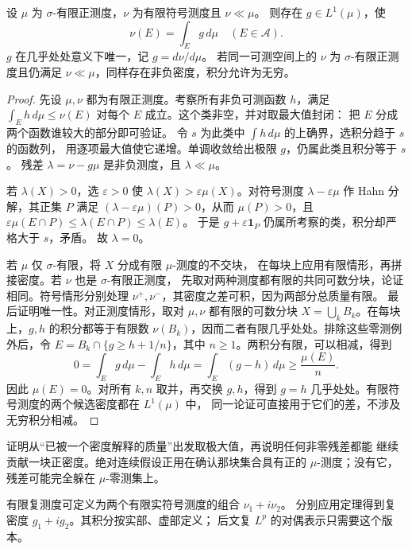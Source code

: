 \begin{theorem}\label{thm:radon-nikodym}
设 \(\mu\) 为 \(\sigma\)-有限正测度，\(\nu\) 为有限符号测度且 \(\nu\ll\mu\)。
则存在 \(g\in L^1(\mu)\)，使
\[
 \nu(E)=\int_Eg\,d\mu\quad(E\in\mathcal A).
\]
\(g\) 在几乎处处意义下唯一，记 \(g=d\nu/d\mu\)。
若同一可测空间上的 \(\nu\) 为 \(\sigma\)-有限正测度且仍满足
\(\nu\ll\mu\)，同样存在非负密度，积分允许为无穷。
\end{theorem}
\begin{proof}
先设 \(\mu,\nu\) 都为有限正测度。考察所有非负可测函数 \(h\)，满足
\(\int_Eh\,d\mu\le\nu(E)\) 对每个 \(E\) 成立。这个类非空，并对取最大值封闭：
把 \(E\) 分成两个函数谁较大的部分即可验证。
令 \(s\) 为此类中 \(\int h\,d\mu\) 的上确界，选积分趋于 \(s\) 的函数列，
用逐项最大值使它递增。单调收敛给出极限 \(g\)，仍属此类且积分等于 \(s\)。
残差 \(\lambda=\nu-g\mu\) 是非负测度，且 \(\lambda\ll\mu\)。

若 \(\lambda(X)>0\)，选 \(\varepsilon>0\) 使
\(\lambda(X)>\varepsilon\mu(X)\)。对符号测度 \(\lambda-\varepsilon\mu\)
作 Hahn 分解，其正集 \(P\) 满足
\((\lambda-\varepsilon\mu)(P)>0\)，从而 \(\mu(P)>0\)，且
\(\varepsilon\mu(E\cap P)\le\lambda(E\cap P)\le\lambda(E)\)。
于是 \(g+\varepsilon\mathbf1_P\) 仍属所考察的类，积分却严格大于 \(s\)，矛盾。
故 \(\lambda=0\)。

若 \(\mu\) 仅 \(\sigma\)-有限，将 \(X\) 分成有限 \(\mu\)-测度的不交块，
在每块上应用有限情形，再拼接密度。若 \(\nu\) 也是 \(\sigma\)-有限正测度，
先取对两种测度都有限的共同可数分块，论证相同。符号情形分别处理
\(\nu^+,\nu^-\)，其密度之差可积，因为两部分总质量有限。
最后证明唯一性。对正测度情形，取对 \(\mu,\nu\) 都有限的可数分块
\(X=\bigcup_k B_k\)。在每块上，\(g,h\) 的积分都等于有限数
\(\nu(B_k)\)，因而二者有限几乎处处。排除这些零测例外后，令
\(E=B_k\cap\{g\ge h+1/n\}\)，其中 \(n\ge1\)。两积分有限，可以相减，得到
\[
 0=\int_Eg\,d\mu-\int_Eh\,d\mu
   =\int_E(g-h)\,d\mu\ge\frac{\mu(E)}n.
\]
因此 \(\mu(E)=0\)。对所有 \(k,n\) 取并，再交换 \(g,h\)，得到
\(g=h\) 几乎处处。有限符号测度的两个候选密度都在 \(L^1(\mu)\) 中，
同一论证可直接用于它们的差，不涉及无穷积分相减。
\end{proof}

证明从“已被一个密度解释的质量”出发取极大值，再说明任何非零残差都能
继续贡献一块正密度。绝对连续假设正用在确认那块集合具有正的
\(\mu\)-测度；没有它，残差可能完全躲在 \(\mu\)-零测集上。

有限复测度可定义为两个有限实符号测度的组合 \(\nu_1+i\nu_2\)。
分别应用定理得到复密度 \(g_1+ig_2\)。其积分按实部、虚部定义；
后文复 \(L^p\) 的对偶表示只需要这个版本。

